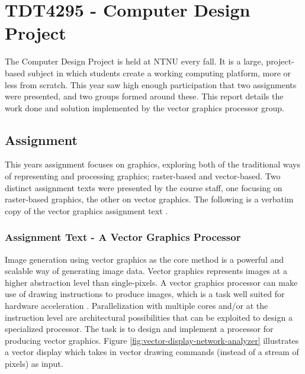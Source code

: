 \chapter{TDT4295 - Computer Design Project}
\label{sec:intro}

The Computer Design Project is held at NTNU every fall.
It is a large, project-based subject in which students create a working computing platform, more or less from scratch.
This year saw high enough participation that two assignments were presented, and two groups formed around these.
This report details the work done and solution implemented by the vector graphics processor group.

\section{Assignment}

This years assignment focuses on graphics, exploring both of the traditional ways of representing and processing graphics; raster-based and vector-based.
Two distinct assignment texts were presented by the course staff, one focusing on raster-based graphics, the other on vector graphics.
The following is a verbatim copy of the vector graphics assignment text \cite{assignment-text}.

\subsection{Assignment Text - A Vector Graphics Processor}

Image generation using vector graphics as the core method is a powerful and scalable way of generating image data.
Vector graphics represents images at a higher abstraction level than single-pixels.
A vector graphics processor can make use of drawing instructions to produce images, which is a task well suited for hardware acceleration \cite{openvg}.
Parallelization with multiple cores and/or at the instruction level are architectural possibilities that can be exploited to design a specialized processor.
The task is to design and implement a processor for producing vector graphics.
Figure \ref{fig:vector-display-network-analyzer} illustrates a vector display which takes in vector drawing commands (instead of a stream of pixels) as input.

